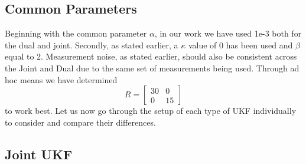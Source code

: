\subsection{Common Parameters}
Beginning with the common parameter $\alpha$, in our work we have used 1e-3 both for the dual and joint. Secondly, as stated earlier, a $\kappa$ value of 0 has been used and $\beta$ equal to 2. Measurement noise, as stated earlier, should also be consistent across the Joint and Dual due to the same set of measurements being used. Through ad hoc means we have determined
$$R = \begin{bmatrix}
30 & 0\\0 & 15\end{bmatrix}$$
to work best.
Let us now go through the setup of each type of UKF individually to consider and compare their differences.

\subsection{Joint UKF}

